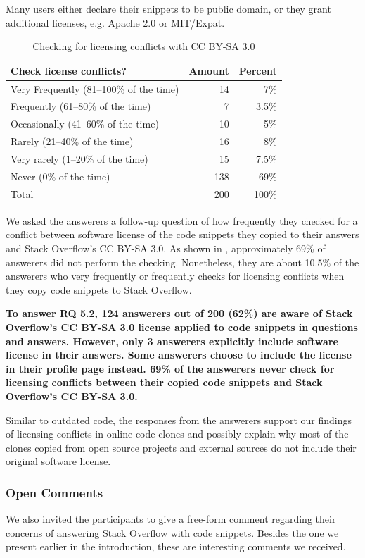 \documentclass[10pt,journal,compsoc]{IEEEtran}
\begin{document}
Many users either declare their snippets to be public domain, or they grant
additional licenses, e.g. Apache 2.0 or MIT/Expat.

\begin{table}
	\centering
	\caption{Checking for licensing conflicts with CC BY-SA 3.0}
	\label{tab:survey_license_check}
	\begin{tabular}{lrr}
		\toprule
		Check license conflicts? & Amount & Percent \\
		\midrule
		Very Frequently (81--100\% of the time)	& 14 & 7\% \\
		Frequently (61--80\% of the time) & 7 & 3.5\% \\
		Occasionally (41--60\% of the time) & 10 & 5\% \\
		Rarely (21--40\% of the time) & 16 & 8\% \\
		Very rarely (1--20\% of the time) & 15 & 7.5\% \\
		Never (0\% of the time) & 138 & 69\% \\
		\midrule
		Total & 200 & 100\% \\
		\bottomrule
	\end{tabular}
\end{table}

We asked the answerers a follow-up question of how frequently they checked for a
conflict between software license of the code snippets they copied to their
answers and Stack Overflow's CC BY-SA 3.0. As shown in
, approximately 69\% of answerers did not perform
the checking. Nonetheless, they are about 10.5\% of the answerers who very
frequently or frequently checks for licensing conflicts when they copy code
snippets to Stack Overflow.

\textbf{To answer RQ 5.2, 124 answerers out of 200 (62\%) are aware of Stack Overflow's
CC BY-SA 3.0 license applied to code snippets in questions and answers. However,
only 3 answerers explicitly include software license in their answers. Some 
answerers choose to include the license in their profile page instead. 69\% of the
answerers never check for licensing conflicts between their copied code snippets
and Stack Overflow's CC BY-SA 3.0.}

Similar to outdated code, the responses from the answerers support our findings
of licensing conflicts in online code clones and possibly explain why most of
the clones copied from open source projects and external sources do not include
their original software license.

\subsubsection{Open Comments} We also invited the participants to give a
free-form comment regarding their concerns of answering Stack Overflow with code
snippets. Besides the one we present earlier in the introduction, these are
interesting comments we received.
\end{document}

